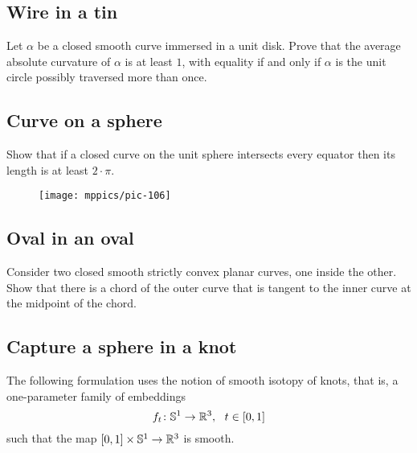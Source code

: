 \subsection*{Wire in a tin}
\label{A spring in a tin} 

\begin{pr}
Let $\alpha$ be a closed smooth curve immersed
in a unit disk. 
Prove that the average absolute curvature of $\alpha$ is at least $1$, with
equality if and only if $\alpha$ is the unit circle possibly traversed more than once.
\end{pr}

\subsection*{Curve on a sphere}
\label{A curve in a sphere}

\begin{pr}
Show that if a closed curve on the unit sphere intersects every equator then its length is at least $2\cdot\pi$.
\end{pr}


{

\begin{wrapfigure}{r}{25 mm}
\vskip2mm
\centering
\texttt{[image: mppics/pic-106]}
\end{wrapfigure}

\subsection*{Oval in an oval}
\label{Oval in oval} 


\begin{pr}
Consider two closed smooth strictly convex planar curves, one inside the other. 
Show that there is a chord of the outer curve that is tangent to the inner curve at the midpoint of the chord.
\end{pr}

}



\subsection*{Capture a sphere in a knot\hard}
\label{Capture a sphere in a knot}

The following formulation uses the notion of smooth isotopy of knots,
that is, a one-parameter family of embeddings 
\[f_t\:\mathbb{S}^1\z\to \RR^3,\ \ t\in[0,1]\] 
such that the map $[0,1]\times \mathbb{S}^1\to\mathbb{R}^3$ is smooth.


